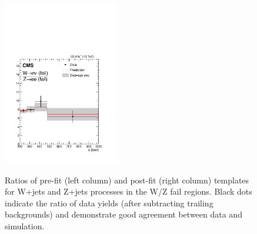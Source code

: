 \begin{figure}
\includegraphics[width=0.45\textwidth]{figures/pullsImpact/ratio_wen_fail_zee_fail_shapes_fit_b.pdf}\\
\caption{Ratios of pre-fit (left column) and post-fit (right column) templates for W+jets and Z+jets processes in the W/Z fail regions. Black dots indicate the ratio of data yields (after subtracting trailing backgrounds) and demonstrate good agreement between data and simulation.}
\label{wzratios}
\end{figure}

\clearpage

